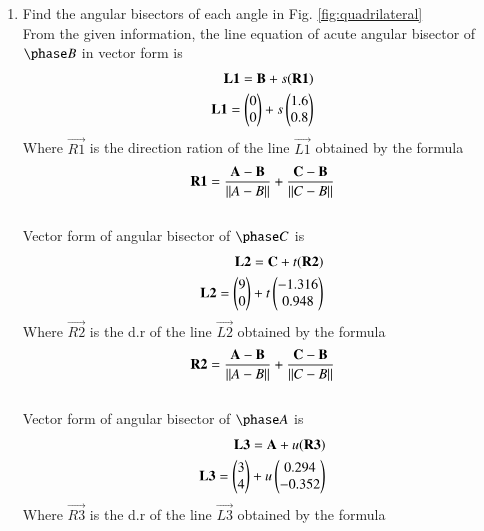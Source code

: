 \begin{enumerate}[label=\thesection.\arabic*.,ref=\thesection.\theenumi]
%
\item Find the angular bisectors of each angle in Fig. \ref{fig:quadrilateral}
\label{const:quadrilateral}
\\
%
\solution 
From the given information, the line equation of acute angular bisector of $\phase B$ in vector form is 
\begin{align}
\label{eq:constr_a}
\mathbf{L1} =  \mathbf{B}+s(\mathbf{R1})
\\
\mathbf{L1} = \begin{pmatrix}0\\0\end{pmatrix}+s\begin{pmatrix}1.6\\0.8\end{pmatrix}
\end{align}
Where $\vec{R1}$ is the direction ration of the line $\vec{L1}$ obtained by the formula
\\
$$\mathbf{R1}=\frac{\mathbf{A}-\mathbf{B}}{\left\lVert A-B\right\rVert}+\frac{\mathbf{C}-\mathbf{B}}{\left\lVert C-B\right\rVert}$$
\\
Vector form of angular bisector of $\phase C$ is
\begin{align}
\label{eq:constr_b}
\mathbf{L2} = \mathbf{C}+t(\mathbf{R2})
\\
\mathbf{L2} = \begin{pmatrix}9\\0\end{pmatrix}+t\begin{pmatrix}-1.316\\0.948\end{pmatrix}
\end{align}
Where $\vec{R2}$ is the d.r of the line $\vec{L2}$ obtained by the formula
\\
$$\mathbf{R2} = \frac{\mathbf{A}-\mathbf{B}}{\left\lVert A-B\right\rVert}+\frac{\mathbf{C}-\mathbf{B}}{\left\lVert C-B\right\rVert}$$
\\
Vector form of angular bisector of $\phase A$ is
\begin{align}
\label{eq:constr_c}
\mathbf{L3} = \mathbf{A}+u(\mathbf{R3})
\\
\mathbf{L3} = \begin{pmatrix}3\\4\end{pmatrix}+u\begin{pmatrix}0.294\\-0.352\end{pmatrix}
\end{align}
Where $\vec{R3}$ is the d.r of the line $\vec{L3}$ obtained by the formula

\end{enumerate}
